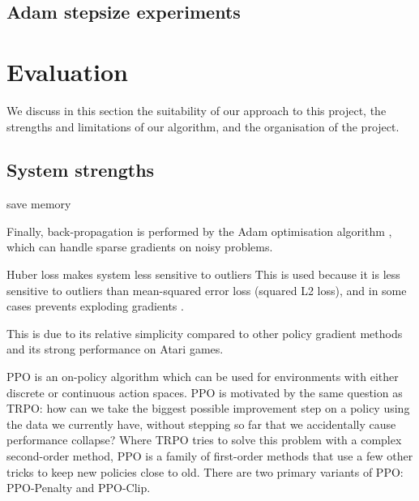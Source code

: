 \documentclass[12pt,a4paper]{article}
\begin{document}
\subsection{Adam stepsize experiments}

\newpage
\section{Evaluation}
We discuss in this section the suitability of our approach to this project, the strengths and limitations of our algorithm, and the organisation of the project.

\subsection{System strengths} 
save memory

Finally, back-propagation is performed by the Adam optimisation algorithm \cite{kingma2017adam}, which can handle sparse gradients on noisy problems.

Huber loss makes system less sensitive to outliers
This is used because it is less sensitive to outliers than mean-squared error loss (squared L2 loss), and in some cases prevents exploding gradients \cite{girshick2015fast}.

This is due to its relative simplicity compared to other policy gradient methods and its strong performance on Atari games.




PPO is an on-policy algorithm which can be used for environments with either discrete or continuous action spaces. PPO is motivated by the same question as TRPO: how can we take the biggest possible improvement step on a policy using the data we currently have, without stepping so far that we accidentally cause performance collapse? Where TRPO tries to solve this problem with a complex second-order method, PPO is a family of first-order methods that use a few other tricks to keep new policies close to old. There are two primary variants of PPO: PPO-Penalty and PPO-Clip.
\end{document}
